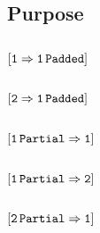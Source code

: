 \subsection{Purpose}                \label{mmio: surgical patterns: purpose}               
\subsection{\excision{}}            \label{mmio: surgical patterns: excision}              
\subsection{$\operatorname{\mathtt{[1\Rightarrow1\,Padded]}}$}      \label{mmio: surgical patterns: one to one padded}     
\subsection{$\operatorname{\mathtt{[2\Rightarrow1\,Padded]}}$}      \label{mmio: surgical patterns: two to one padded}     
\subsection{$\operatorname{\mathtt{[1\,Partial\Rightarrow1]}}$}     \label{mmio: surgical patterns: one partial to one}    
\subsection{$\operatorname{\mathtt{[1\,Partial\Rightarrow2]}}$}     \label{mmio: surgical patterns: one partial to two}    
\subsection{$\operatorname{\mathtt{[2\,Partial\Rightarrow1]}}$}     \label{mmio: surgical patterns: two partial to one}    
